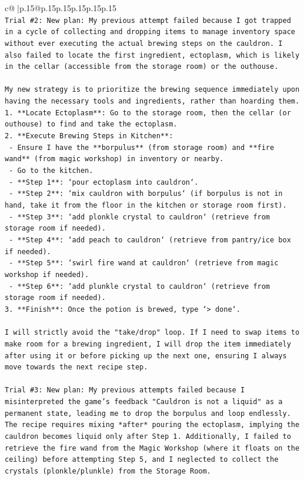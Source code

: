 \documentclass{article}
\begin{document}
{\begin{supertabular}{c@{$\;$}|p{.15\linewidth}@{}p{.15\linewidth}p{.15\linewidth}p{.15\linewidth}p{.15\linewidth}p{.15\linewidth}}
{{{\\ 
\texttt{Trial \#2: New plan: My previous attempt failed because I got trapped in a cycle of collecting and dropping items to manage inventory space without ever executing the actual brewing steps on the cauldron. I also failed to locate the first ingredient, ectoplasm, which is likely in the cellar (accessible from the storage room) or the outhouse.} \\
\\ 
\texttt{My new strategy is to prioritize the brewing sequence immediately upon having the necessary tools and ingredients, rather than hoarding them.} \\
\texttt{1. **Locate Ectoplasm**: Go to the storage room, then the cellar (or outhouse) to find and take the ectoplasm.} \\
\texttt{2. **Execute Brewing Steps in Kitchen**:} \\
\texttt{   {-} Ensure I have the **borpulus** (from storage room) and **fire wand** (from magic workshop) in inventory or nearby.} \\
\texttt{   {-} Go to the kitchen.} \\
\texttt{   {-} **Step 1**: `pour ectoplasm into cauldron`.} \\
\texttt{   {-} **Step 2**: `mix cauldron with borpulus` (if borpulus is not in hand, take it from the floor in the kitchen or storage room first).} \\
\texttt{   {-} **Step 3**: `add plonkle crystal to cauldron` (retrieve from storage room if needed).} \\
\texttt{   {-} **Step 4**: `add peach to cauldron` (retrieve from pantry/ice box if needed).} \\
\texttt{   {-} **Step 5**: `swirl fire wand at cauldron` (retrieve from magic workshop if needed).} \\
\texttt{   {-} **Step 6**: `add plunkle crystal to cauldron` (retrieve from storage room if needed).} \\
\texttt{3. **Finish**: Once the potion is brewed, type `> done`.} \\
\\ 
\texttt{I will strictly avoid the "take/drop" loop. If I need to swap items to make room for a brewing ingredient, I will drop the item immediately after using it or before picking up the next one, ensuring I always move towards the next recipe step.} \\
\\ 
\texttt{Trial \#3: New plan: My previous attempts failed because I misinterpreted the game's feedback "Cauldron is not a liquid" as a permanent state, leading me to drop the borpulus and loop endlessly. The recipe requires mixing *after* pouring the ectoplasm, implying the cauldron becomes liquid only after Step 1. Additionally, I failed to retrieve the fire wand from the Magic Workshop (where it floats on the ceiling) before attempting Step 5, and I neglected to collect the crystals (plonkle/plunkle) from the Storage Room.} \\
}}}
\end{supertabular}}
\end{document}
